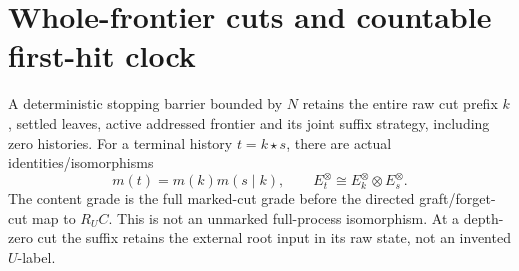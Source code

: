 \documentclass[11pt]{article}
\begin{document}
\section{Whole-frontier cuts and countable first-hit clock}
A deterministic stopping barrier bounded by $N$ retains the entire raw cut prefix $k$, settled leaves, active addressed frontier and its joint suffix strategy, including zero histories. For a terminal history $t=k\star s$, there are actual identities/isomorphisms
\[
 m(t)=m(k)m(s\mid k),\qquad E_t^\otimes\cong E_k^\otimes\otimes E_s^\otimes. \tag{4}
\]
The content grade is the full marked-cut grade before the directed graft/forget-cut map to $R_UC$. This is not an unmarked full-process isomorphism. At a depth-zero cut the suffix retains the external root input in its raw state, not an invented $U$-label.
\end{document}
